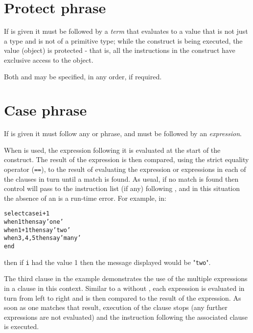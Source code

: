 \section{Protect phrase}
 
If  is given it must be followed by a \emph{term}
that evaluates to a value that is not just a type and is not of a
primitive type;
while the  construct is being executed, the value
(object) is protected - that is, all the instructions in the
 construct have exclusive access to the object.
 
Both  and  may be specified, in any order,
if required.
\section{Case phrase}
 
If  is given it must follow any  or
 phrase, and must be followed by an
\emph{expression}.
 
When  is used, the expression following it is evaluated at
the start of the  construct.
The result of the expression is then compared, using the strict equality
operator (\texttt{==}), to the result of evaluating the expression
or expressions in each of the  clauses in turn until
a match is found.  As usual, if no match is found then control
will pass to the instruction list (if any) following
, and in this situation the absence of an
 is a run-time error.
 For example, in:
\begin{alltt}
select case i+1
  when 1 then say 'one'
  when 1+1 then say 'two'
  when 3, 4, 5 then say 'many'
end
\end{alltt}
then if \texttt{i} had the value 1 then the message displayed would be
"\texttt{two}".
 
The third  clause in the example demonstrates the use of the
multiple expressions in a  clause in this context.
Similar to a  without , each
expression is evaluated in turn from left to right and is then
compared to the result of the  expression.
As soon as one matches that result, execution of the
 clause stops (any further expressions are not
evaluated) and the instruction following the associated
 clause is executed.

